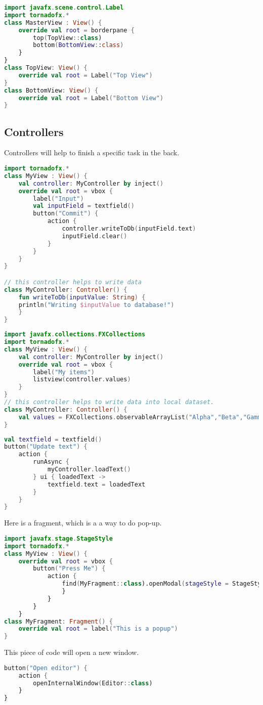 \documentclass[12pt]{article}
\begin{document}
\begin{lstlisting}[language=Kotlin]
import javafx.scene.control.Label
import tornadofx.*
class MasterView : View() {
	override val root = borderpane {
		top(TopView::class)
		bottom(BottomView::class)
	}
}
class TopView: View() {
	override val root = Label("Top View")
}
class BottomView: View() {
	override val root = Label("Bottom View")
}
\end{lstlisting}

\subsection{Controllers}
Controllers will help to finish a specific task in the back.
\begin{lstlisting}[language=Kotlin]
import tornadofx.*
class MyView : View() {
	val controller: MyController by inject()
	override val root = vbox {
		label("Input")
		val inputField = textfield()
		button("Commit") {
			action {
				controller.writeToDb(inputField.text)
				inputField.clear()
			}
		}
	}
}

// this controller helps to write data
class MyController: Controller() {
	fun writeToDb(inputValue: String) {
	println("Writing $inputValue to database!")
	}
}
\end{lstlisting}


\begin{lstlisting}[language=Kotlin]
import javafx.collections.FXCollections
import tornadofx.*
class MyView : View() {
	val controller: MyController by inject()
	override val root = vbox {
		label("My items")
		listview(controller.values)
	}
}
// this controller helps to write data into local dataset.
class MyController: Controller() {
	val values = FXCollections.observableArrayList("Alpha","Beta","Gamma","Delta")
}
\end{lstlisting}

\begin{lstlisting}[language=Kotlin]
val textfield = textfield()
button("Update text") {
	action {
		runAsync {
			myController.loadText()
		} ui { loadedText ->
			textfield.text = loadedText
		}
	}
}
\end{lstlisting}
Here is a fragment, which is a a way to do pop-up.
\begin{lstlisting}[language=Kotlin]
import javafx.stage.StageStyle
import tornadofx.*
class MyView : View() {
	override val root = vbox {
		button("Press Me") {
			action {
				find(MyFragment::class).openModal(stageStyle = StageStyle.UTILITY)
				}
			}
		}
	}
class MyFragment: Fragment() {
	override val root = label("This is a popup")
}
\end{lstlisting}
This piece of code will open a new window.
\begin{lstlisting}[language=Kotlin]
button("Open editor") {
	action {
		openInternalWindow(Editor::class)
	}
}
\end{lstlisting}
\end{document}
